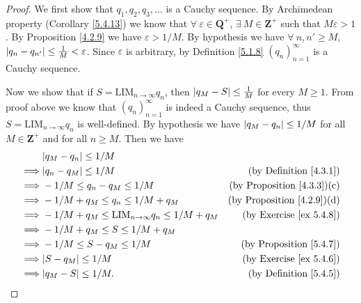 \begin{proof}
    We first show that \(q_1, q_2, q_3, \dots\) is a Cauchy sequence.
    By Archimedean property (Corollary \ref{5.4.13}) we know that \(\forall\ \varepsilon \in \mathbf{Q}^+\), \(\exists\ M \in \mathbf{Z}^+\) such that \(M\varepsilon > 1\).
    By Proposition \ref{4.2.9} we have \(\varepsilon > 1 / M\).
    By hypothesis we have \(\forall\ n, n' \geq M\), \(\abs*{q_n - q_{n'}} \leq \frac{1}{M} < \varepsilon\).
    Since \(\varepsilon\) is arbitrary, by Definition \ref{5.1.8} \((q_n)_{n = 1}^{\infty}\) is a Cauchy sequence.

    Now we show that if \(S = \text{LIM}_{n \to \infty} q_n\), then \(\abs*{q_M - S} \leq \frac{1}{M}\) for every \(M \geq 1\).
    From proof above we know that \((q_n)_{n = 1}^\infty\) is indeed a Cauchy sequence, thus \(S = \text{LIM}_{n \to \infty} q_n\) is well-defined.
    By hypothesis we have \(\abs*{q_M - q_n} \leq 1 / M\) for all \(M \in \mathbf{Z}^+\) and for all \(n \geq M\).
    Then we have
    \begin{align*}
                 & \abs*{q_M - q_n} \leq 1 / M                                                                               \\
        \implies & \abs*{q_n - q_M} \leq 1 / M                                      & \text{(by Definition \ref{4.3.1})}     \\
        \implies & -1 / M \leq q_n - q_M \leq 1 / M                                 & \text{(by Proposition \ref{4.3.3})(c)} \\
        \implies & -1 / M + q_M \leq q_n \leq 1 / M + q_M                           & \text{(by Proposition \ref{4.2.9})(d)} \\
        \implies & -1 / M + q_M \leq \text{LIM}_{n \to \infty} q_n \leq 1 / M + q_M & \text{(by Exercise \ref{ex 5.4.8})}    \\
        \implies & -1 / M + q_M \leq S \leq 1 / M + q_M                                                                      \\
        \implies & -1 / M \leq S - q_M \leq 1 / M                                   & \text{(by Proposition \ref{5.4.7})}    \\
        \implies & \abs*{S - q_M} \leq 1 / M                                        & \text{(by Exercise \ref{ex 5.4.6})}    \\
        \implies & \abs*{q_M - S} \leq 1 / M.                                       & \text{(by Definition \ref{5.4.5})}
    \end{align*}
\end{proof}

